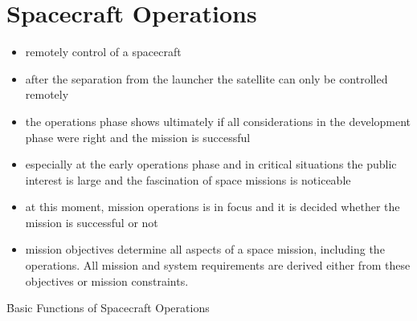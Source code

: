 \section{Spacecraft Operations}
\begin{itemize}
 \item remotely control of a spacecraft
 \item after the separation from the launcher the satellite can only be controlled remotely
 \item the operations phase shows ultimately if all considerations in the development phase were right and the mission is successful
 \item especially at the early operations phase and in critical situations the public interest is large and the fascination of space missions is noticeable
 \item at this moment, mission operations is in focus and it is decided whether the mission is successful or not
 \item mission objectives determine all aspects of a space mission, including the operations. All mission and system requirements are derived either from these objectives or mission
 constraints.
\end{itemize}
\f{Basic Functions of Spacecraft Operations}
